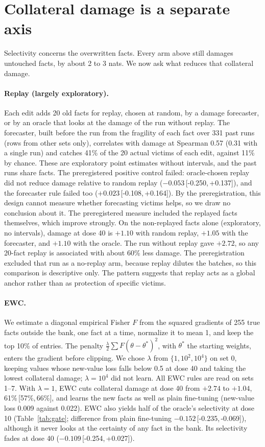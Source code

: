 \documentclass[11pt]{article}
\newcommand{\ci}[2]{\,[#1,\,#2]}
\begin{document}
\section{Collateral damage is a separate axis}
\label{sec:collateral}

Selectivity concerns the overwritten facts.
Every arm above still damages untouched facts, by about 2 to 3 nats.
We now ask what reduces that collateral damage.

\paragraph{Replay (largely exploratory).}
Each edit adds 20 old facts for replay, chosen at random, by a damage forecaster, or by an oracle that looks at the damage of the run without replay.
The forecaster, built before the run from the fragility of each fact over 331 past runs (rows from other sets only), correlates with damage at Spearman 0.57 (0.31 with a single run) and catches 41\% of the 20 actual victims of each edit, against 11\% by chance. These are exploratory point estimates without intervals, and the past runs share facts.
The preregistered positive control failed: oracle-chosen replay did not reduce damage relative to random replay ($-0.053$\ci{-0.250}{+0.137}), and the forecaster rule failed too ($+0.023$\ci{-0.108}{+0.164}).
By the preregistration, this design cannot measure whether forecasting victims helps, so we draw no conclusion about it.
The preregistered measure included the replayed facts themselves, which improve strongly. On the non-replayed facts alone (exploratory, no intervals), damage at dose 40 is $+1.10$ with random replay, $+1.05$ with the forecaster, and $+1.10$ with the oracle.
The run without replay gave $+2.72$, so any 20-fact replay is associated with about 60\% less damage. The preregistration excluded that run as a no-replay arm, because replay dilutes the batches, so this comparison is descriptive only.
The pattern suggests that replay acts as a global anchor rather than as protection of specific victims.

\paragraph{EWC.}
We estimate a diagonal empirical Fisher $F$ from the squared gradients of 255 true facts outside the bank, one fact at a time, normalize it to mean 1, and keep the top 10\% of entries.
The penalty $\tfrac{\lambda}{2}\sum F(\theta-\theta^*)^2$, with $\theta^*$ the starting weights, enters the gradient before clipping.
We chose $\lambda$ from $\{1, 10^2, 10^4\}$ on set 0, keeping values whose new-value loss falls below 0.5 at dose 40 and taking the lowest collateral damage; $\lambda=10^4$ did not learn.
All EWC rules are read on sets 1--7.
With $\lambda=1$, EWC cuts collateral damage at dose 40 from $+2.74$ to $+1.04$, 61\%\ci{57\%}{66\%}, and learns the new facts as well as plain fine-tuning (new-value loss 0.009 against 0.022).
EWC also yields half of the oracle's selectivity at dose 10 (Table~\ref{tab:gate}; difference from plain fine-tuning $-0.152$\ci{-0.235}{-0.069}), although it never looks at the certainty of any fact in the bank.
Its selectivity fades at dose 40 ($-0.109$\ci{-0.254}{+0.027}).
\end{document}
